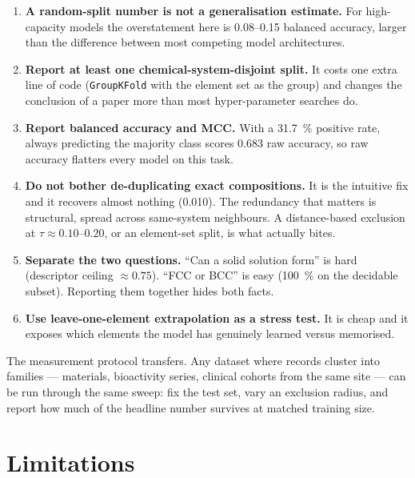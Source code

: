 \documentclass[11pt]{article}
\begin{document}
\begin{enumerate}
\item \textbf{A random-split number is not a generalisation estimate.} For high-capacity models the overstatement here is 0.08--0.15 balanced accuracy, larger than the difference between most competing model architectures.
\item \textbf{Report at least one chemical-system-disjoint split.} It costs one extra line of code (\texttt{GroupKFold} with the element set as the group) and changes the conclusion of a paper more than most hyper-parameter searches do.
\item \textbf{Report balanced accuracy and MCC.} With a \SI{31.7}{\percent} positive rate, always predicting the majority class scores 0.683 raw accuracy, so raw accuracy flatters every model on this task.
\item \textbf{Do not bother de-duplicating exact compositions.} It is the intuitive fix and it recovers almost nothing (0.010). The redundancy that matters is structural, spread across same-system neighbours. A distance-based exclusion at $\tau \approx 0.10$--$0.20$, or an element-set split, is what actually bites.
\item \textbf{Separate the two questions.} ``Can a solid solution form'' is hard (descriptor ceiling $\approx 0.75$). ``FCC or BCC'' is easy (\SI{100}{\percent} on the decidable subset). Reporting them together hides both facts.
\item \textbf{Use leave-one-element extrapolation as a stress test.} It is cheap and it exposes which elements the model has genuinely learned versus memorised.
\end{enumerate}

The measurement protocol transfers. Any dataset where records cluster into families --- materials, bioactivity series, clinical cohorts from the same site --- can be run through the same sweep: fix the test set, vary an exclusion radius, and report how much of the headline number survives at matched training size.

\section{Limitations}
\end{document}
